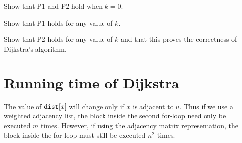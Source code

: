 \begin{Boxample}[3]
Show that P1 and P2 hold when $k = 0$.
\end{Boxample}
\begin{Boxample}[9]
Show that P1 holds for any value of $k$.
\end{Boxample}
\begin{Boxample}[9]
Show that P2 holds for any value of $k$ and that this proves the correctness of Dijkstra's algorithm.
\end{Boxample}
%
%



\section{Running time of Dijkstra}

The value of $\operatorname{\text{\texttt{dist}}}[x]$ will change only if $x$ is adjacent to $u$.
Thus if we use a weighted adjacency list, the block inside the
second for-loop need only be executed $m$ times. 
However, if using the adjacency matrix representation, the block inside the for-loop
must still be executed $n^2$ times.

